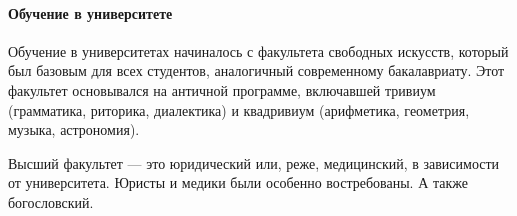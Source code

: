 \paragraph{Обучение в университете}

Обучение в университетах начиналось с факультета свободных искусств, который был базовым для всех студентов, аналогичный современному бакалавриату. Этот факультет основывался на античной программе, включавшей тривиум (грамматика, риторика, диалектика) и квадривиум (арифметика, геометрия, музыка, астрономия).




Высший факультет --- это юридический или, реже, медицинский, в зависимости от университета. Юристы и медики были особенно востребованы. А также богословский.

